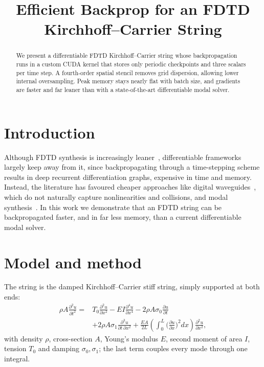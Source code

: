 \documentclass[a4paper]{article}
\title{Efficient Backprop for an FDTD Kirchhoff--Carrier String}
\providecommand{\bstctlentry}[1]{\nocite{#1}}
\begin{document}
\bstctlentry{BSTcontrol}
\ninept
\maketitle
\begin{sloppy}
\begin{abstract}
We present a differentiable FDTD Kirchhoff--Carrier string whose
backpropagation runs in a custom CUDA kernel that stores only periodic
checkpoints and three scalars per time step. A fourth-order spatial stencil
removes grid dispersion, allowing lower internal oversampling. Peak memory
stays nearly flat with batch size, and gradients are faster and far leaner
than with a state-of-the-art differentiable modal solver.
\end{abstract}

\section{Introduction}
Although FDTD synthesis is increasingly leaner~\cite{bilbao2024guitar},
differentiable frameworks~\cite{engel2020ddsp} largely keep away from it,
since backpropagating through a time-stepping scheme results in deep
recurrent differentiation graphs, expensive in time and memory. Instead, the
literature has favoured cheaper approaches like digital
waveguides~\cite{tablas2026waveguides,tablas2026sound}, which do not
naturally capture nonlinearities and collisions, and modal
synthesis~\cite{diaz2025}. In this work we demonstrate that an FDTD string
can be backpropagated faster, and in far less memory, than a current
differentiable modal solver.

\section{Model and method}
The string is the damped Kirchhoff--Carrier stiff string, simply supported at
both ends:
\begin{equation}
\begin{aligned}
\rho A\frac{\partial^2u}{\partial t^2}={}&T_0\frac{\partial^2u}{\partial x^2}
 -EI\frac{\partial^4u}{\partial x^4}
 -2\rho A\sigma_0\frac{\partial u}{\partial t}\\
 &+2\rho A\sigma_1\frac{\partial^3u}{\partial t\,\partial x^2}
 +\frac{EA}{2L}\!\left(\int_0^L\Big(\frac{\partial u}{\partial x}\Big)^2dx\right)
 \frac{\partial^2u}{\partial x^2},
\end{aligned}
\label{eq:pde}
\end{equation}
with density $\rho$, cross-section $A$, Young's modulus $E$, second moment of
area $I$, tension $T_0$ and damping $\sigma_0,\sigma_1$; the last term couples
every mode through one integral.


\end{sloppy}
\end{document}
